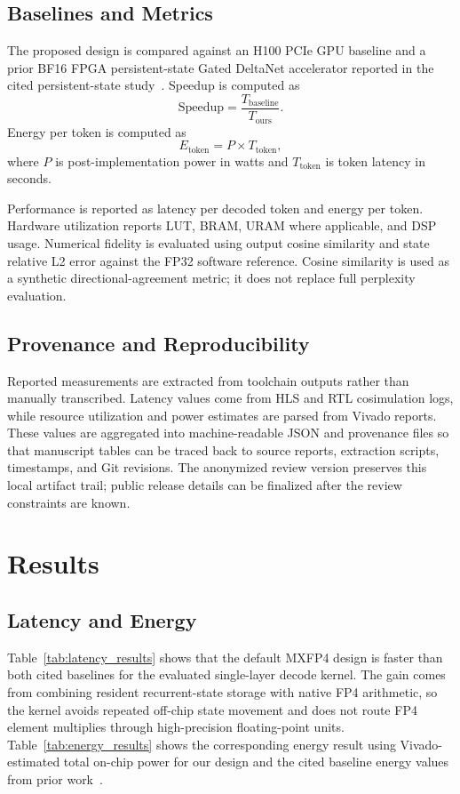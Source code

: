 \documentclass[conference]{IEEEtran}
\begin{document}
\subsection{Baselines and Metrics}
The proposed design is compared against an H100 PCIe GPU baseline and a prior BF16 FPGA persistent-state Gated DeltaNet accelerator reported in the cited persistent-state study~\cite{b6}. Speedup is computed as
\begin{equation}
\text{Speedup} = \frac{T_{\text{baseline}}}{T_{\text{ours}}}.
\end{equation}
Energy per token is computed as
\begin{equation}
E_{\text{token}} = P \times T_{\text{token}},
\end{equation}
where $P$ is post-implementation power in watts and $T_{\text{token}}$ is token latency in seconds.

Performance is reported as latency per decoded token and energy per token. Hardware utilization reports LUT, BRAM, URAM where applicable, and DSP usage. Numerical fidelity is evaluated using output cosine similarity and state relative L2 error against the FP32 software reference. Cosine similarity is used as a synthetic directional-agreement metric; it does not replace full perplexity evaluation.

\subsection{Provenance and Reproducibility}
Reported measurements are extracted from toolchain outputs rather than manually transcribed. Latency values come from HLS and RTL cosimulation logs, while resource utilization and power estimates are parsed from Vivado reports. These values are aggregated into machine-readable JSON and provenance files so that manuscript tables can be traced back to source reports, extraction scripts, timestamps, and Git revisions. The anonymized review version preserves this local artifact trail; public release details can be finalized after the review constraints are known.

\section{Results}

\subsection{Latency and Energy}
Table~\ref{tab:latency_results} shows that the default MXFP4 design is faster than both cited baselines for the evaluated single-layer decode kernel. The gain comes from combining resident recurrent-state storage with native FP4 arithmetic, so the kernel avoids repeated off-chip state movement and does not route FP4 element multiplies through high-precision floating-point units. Table~\ref{tab:energy_results} shows the corresponding energy result using Vivado-estimated total on-chip power for our design and the cited baseline energy values from prior work~\cite{b6}.
\end{document}
